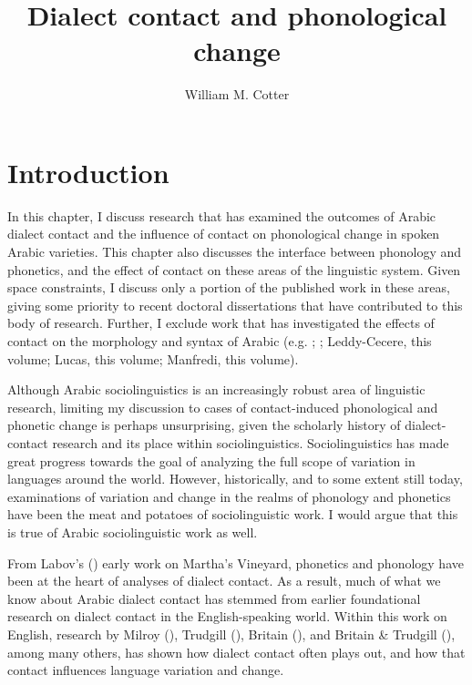\documentclass[output=paper]{langsci/langscibook}
\author{William M. Cotter\affiliation{University of Arizona}}
\title{Dialect contact and phonological change}
\begin{document}
\maketitle 
 
 
\section{Introduction}

In this chapter, I discuss research that has examined the outcomes of Arabic dialect contact and the influence of contact on phonological change in spoken Arabic varieties. This chapter also discusses the interface between phonology and phonetics, and the effect of contact on these areas of the linguistic system. Given space constraints, I discuss only a portion of the published work in these areas, giving some priority to recent doctoral dissertations that have contributed to this body of research. Further, I exclude work that has investigated the effects of contact on the morphology and syntax of Arabic (e.g. \citealt{Al-WerEtAl2015}; \citealt{GafterHoresh2015}; Leddy-Cecere, this volume; Lucas, this volume; Manfredi, this volume). 

  Although Arabic sociolinguistics is an increasingly robust area of linguistic research, limiting my discussion to cases of contact-induced phonological and phonetic change is perhaps unsurprising, given the scholarly history of dialect-contact research and its place within sociolinguistics. Sociolinguistics has made great progress towards the goal of analyzing the full scope of variation in languages around the world. However, historically, and to some extent still today, examinations of variation and change in the realms of phonology and phonetics have been the meat and potatoes of sociolinguistic work. I would argue that this is true of Arabic sociolinguistic work as well. 

  From Labov's (\citeyear{Labov1963}) early work on Martha’s Vineyard, phonetics and phonology have been at the heart of analyses of dialect contact. As a result, much of what we know about Arabic dialect contact has stemmed from earlier foundational research on dialect contact in the English-speaking world. Within this work on English, research by Milroy (\citeyear{Milroy1987}), Trudgill (\citeyear{Trudgill1986,Trudgill2004}), Britain (\citeyear{Britain2002}), and Britain \& Trudgill (\citeyear{BritainTrudgill2009}), among many others, has shown how dialect contact often plays out, and how that contact influences language variation and change. 
\end{document}
